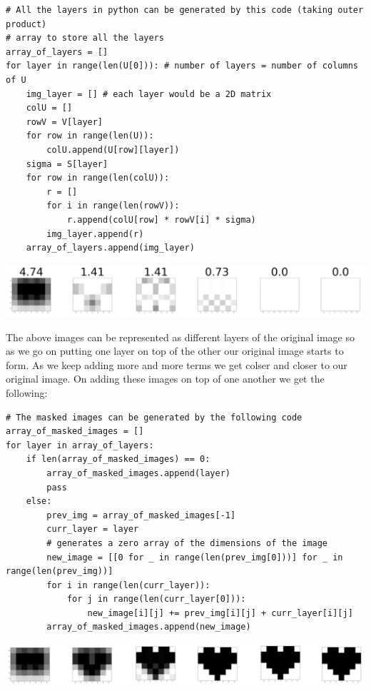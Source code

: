 \documentclass{article}
\begin{document}
\begin{verbatim}
# All the layers in python can be generated by this code (taking outer product)
# array to store all the layers
array_of_layers = []
for layer in range(len(U[0])): # number of layers = number of columns of U
    img_layer = [] # each layer would be a 2D matrix
    colU = []
    rowV = V[layer]
    for row in range(len(U)):
        colU.append(U[row][layer])
    sigma = S[layer]
    for row in range(len(colU)):
        r = []
        for i in range(len(rowV)):
            r.append(colU[row] * rowV[i] * sigma)
        img_layer.append(r)
    array_of_layers.append(img_layer)
\end{verbatim}

\begin{center}
    \includegraphics[width=16.5cm]{components.png}
\end{center}

The above images can be represented as different layers of the original image so as we go on putting one layer on top of the other our original image starts to form. As we keep adding more and more terms we get colser and closer to our original image. On adding these images on top of one another we get the following:

\begin{verbatim}
# The masked images can be generated by the following code
array_of_masked_images = []
for layer in array_of_layers:
    if len(array_of_masked_images) == 0:
        array_of_masked_images.append(layer)
        pass
    else:
        prev_img = array_of_masked_images[-1]
        curr_layer = layer
        # generates a zero array of the dimensions of the image
        new_image = [[0 for _ in range(len(prev_img[0]))] for _ in range(len(prev_img))]
        for i in range(len(curr_layer)):
            for j in range(len(curr_layer[0])):
                new_image[i][j] += prev_img[i][j] + curr_layer[i][j]
        array_of_masked_images.append(new_image)
\end{verbatim}

\begin{center}
    \includegraphics[width=16.5cm]{masked_images.png}
\end{center}
\end{document}
